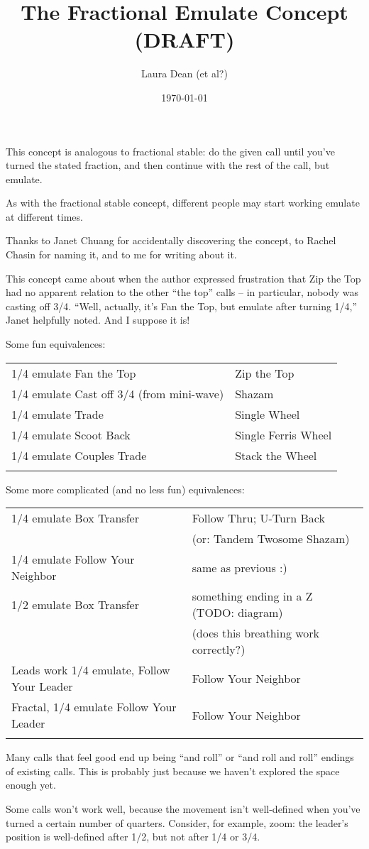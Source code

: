 \documentclass[11pt]{article}
\title{The Fractional Emulate Concept (DRAFT)}
\author{Laura Dean (et al?)}
\date{\today}
\begin{document}
\thispagestyle{empty}
\maketitle


This concept is analogous to fractional stable:
do the given call until you've turned the stated fraction,
and then continue with the rest of the call, but emulate.

As with the fractional stable concept, different people may start
working emulate at different times.

Thanks to Janet Chuang for accidentally discovering the concept,
to Rachel Chasin for naming it, and to me for writing about it.

This concept came about when the author expressed frustration that Zip
the Top had no apparent relation to the other ``the top'' calls -- in
particular, nobody was casting off 3/4. 
``Well, actually, it's Fan the Top, but emulate after turning 1/4,''
Janet helpfully noted.  And I suppose it is!

Some fun equivalences:

\begin{tabular}{ll}
\hline
1/4 emulate Fan the Top   & Zip the Top \\
1/4 emulate Cast off 3/4 (from mini-wave)  & Shazam \\
1/4 emulate Trade                          & Single Wheel \\
1/4 emulate Scoot Back  & Single Ferris Wheel \\
1/4 emulate Couples Trade  & Stack the Wheel \\
\hline \\
\end{tabular}

Some more complicated (and no less fun) equivalences:

\begin{tabular}{ll}
\hline
1/4 emulate Box Transfer          & Follow Thru; U-Turn Back \\
 & (or: Tandem Twosome Shazam) \\
1/4 emulate Follow Your Neighbor  & same as previous :) \\
1/2 emulate Box Transfer          & something ending in a Z (TODO: diagram) \\
 & (does this breathing work correctly?) \\
Leads work 1/4 emulate, Follow Your Leader & Follow Your Neighbor \\
Fractal, 1/4 emulate Follow Your Leader    & Follow Your Neighbor \\
\hline \\
\end{tabular}



Many calls that feel good end up being ``and roll'' or ``and roll and
roll'' endings of existing calls.  This is probably just because we
haven't explored the space enough yet.

Some calls won't work well, because the movement isn't well-defined
when you've turned a certain number of quarters.  Consider, for
example, zoom: the leader's position is well-defined after 1/2, but
not after 1/4 or 3/4.
\end{document}
